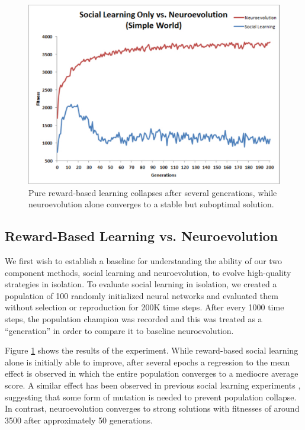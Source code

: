 \documentclass{acm_proc_article-sp}
\begin{document}

\begin{figure}
  \centering
    \includegraphics[scale=.35]{social_learning_vs_neuroevolution.pdf}
  \caption{Pure reward-based learning collapses after several generations, while neuroevolution alone converges to a stable but suboptimal solution.}
  \label{fig:social-neuro}
\end{figure}

\subsection*{Reward-Based Learning vs. Neuroevolution}

We first wish to establish a baseline for understanding the ability of our two component methods, social learning and neuroevolution, to evolve high-quality strategies in isolation. To evaluate social learning in isolation, we created a population of 100 randomly initialized neural networks and evaluated them without selection or reproduction for 200K time steps. After every 1000 time steps, the population champion was recorded and this was treated as a ``generation'' in order to compare it to baseline neuroevolution.

Figure \ref{fig:social-neuro} shows the results of the experiment. While reward-based social learning alone is initially able to improve, after several epochs a regression to the mean effect is observed in which the entire population converges to a mediocre average score. A similar effect has been observed in previous social learning experiments \cite{denaro1996cultural}, suggesting that some form of mutation is needed to prevent population collapse. In contrast, neuroevolution converges to strong solutions with fitnesses of around 3500 after approximately 50 generations.
\end{document}
